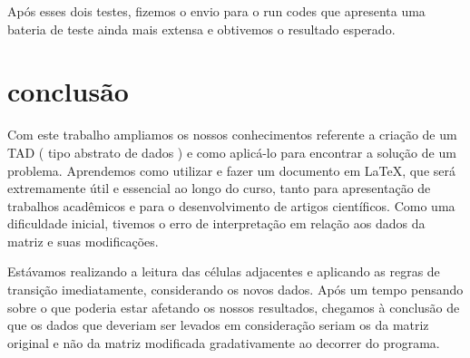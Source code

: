 \documentclass{article}
\begin{document}
Após esses dois testes, fizemos o envio para o run codes que apresenta uma bateria de teste ainda mais extensa e obtivemos o resultado esperado.

\section{conclusão}

Com este trabalho ampliamos os nossos conhecimentos referente a criação de um TAD ( tipo abstrato de dados ) e como aplicá-lo para encontrar a solução de um problema. Aprendemos como utilizar e fazer um documento em LaTeX, que será extremamente útil e essencial ao longo do curso, tanto para apresentação de trabalhos acadêmicos e para o desenvolvimento de artigos científicos.
Como uma dificuldade inicial, tivemos o erro de interpretação em relação aos dados da matriz e suas modificações.

Estávamos realizando a leitura das células adjacentes e aplicando as regras de transição imediatamente, considerando os novos dados. Após um tempo pensando sobre o que poderia estar afetando os nossos resultados, chegamos à conclusão de que os dados que deveriam ser levados em consideração seriam os da matriz original e não da matriz modificada gradativamente ao decorrer do programa.
\end{document}
